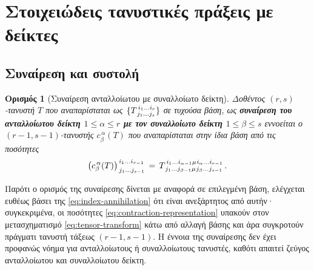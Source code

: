 \documentclass[11pt,a4paper,twoside,openright]{book}
\newtheorem{definition}[lemma]{Ορισμός}
\begin{document}
\section{Στοιχειώδεις τανυστικές πράξεις με δείκτες}

\subsection{Συναίρεση και συστολή}

\begin{definition}[Συναίρεση ανταλλοίωτου με συναλλοίωτο δείκτη]
	\label{def:contraction-of-index}
Δοθέντος $(r,s)$-τανυστή $Τ$ που αναπαρίσταται ως
$\{T^{\,i_1 \dots i_r}_{\hspace{1.5pt}j_1 \dots j_s}\}$
σε τυχούσα βάση, ως \textbf{συναίρεση του ανταλλοίωτου δείκτη $1 \le \alpha \le r$ με τον συναλλοίωτο δείκτη $1 \le \beta \le s$} εννοείται ο $(r-1, s-1)$-τανυστής $c^{\,\alpha}_\beta(T)$ που αναπαρίσταται στην ίδια βάση από τις ποσότητες
\begin{equation}\label{eq:contraction-representation}
\left(c^{\,\alpha}_\beta(T)\right)^{\,i_1 \dots i_{r-1}}_{\,j_1 \dots j_{s-1}}
\,=\,
T^{\,i_1 \dots i_{\alpha-1} \mu \hspace{.5pt} i_{\alpha} \dots i_{r-1}}_{\,j_1 \dots j_{\beta-1} \mu \hspace{.5pt} j_{\beta} \dots j_{s-1}}\,.
\end{equation}
\end{definition}
\noindent
Παρότι ο ορισμός της συναίρεσης δίνεται με αναφορά σε επιλεγμένη βάση, ελέγχεται ευθέως βάσει της \eqref{eq:index-annihilation} ότι είναι ανεξάρτητος από αυτήν· συγκεκριμένα, οι ποσότητες \eqref{eq:contraction-representation}
υπακούν στον μετασχηματισμό \eqref{eq:tensor-transform}
κάτω από αλλαγή βάσης και άρα συγκροτούν πράγματι
τανυστή τάξεως $(r-1, s-1)$.
Η έννοια της συναίρεσης δεν έχει προφανώς νόημα για ανταλλοίωτους ή συναλλοίωτους τανυστές, καθότι απαιτεί ζεύγος ανταλλοίωτου και συναλλοίωτου δείκτη.
\end{document}
